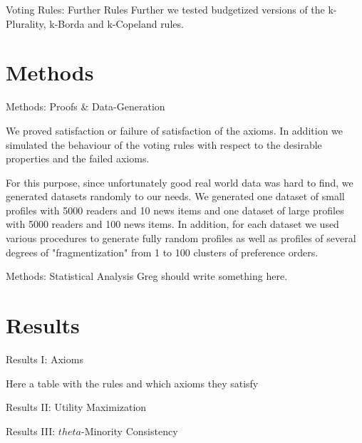 \documentclass{beamer}
\begin{document}
\begin{frame}{Voting Rules: Further Rules}
	Further we tested budgetized versions of the k-Plurality, k-Borda and k-Copeland rules. 
\end{frame}

\section{Methods}

\begin{frame}{Methods: Proofs \& Data-Generation}

We proved satisfaction or failure of satisfaction of the axioms. In addition we simulated the behaviour of the voting rules with respect to the desirable properties and the failed axioms. 

For this purpose, since unfortunately good real world data was hard to find, we generated datasets randomly to our needs. We generated one dataset of small profiles with 5000 readers and 10 news items and one dataset of large profiles with 5000 readers and 100 news items. In addition, for each dataset we used various procedures to generate fully random profiles as well as profiles of several degrees of "fragmentization" from 1 to 100 clusters of preference orders.

\end{frame}

\begin{frame}{Methods: Statistical Analysis}
	Greg should write something here.
\end{frame}

\section{Results}

\begin{frame}{Results I: Axioms}
	
	Here a table with the rules and which axioms they satisfy
	
\end{frame}

\begin{frame}{Results II: Utility Maximization}
	
\end{frame}

\begin{frame}{Results III: $theta$-Minority Consistency}
	
\end{frame}
\end{document}
